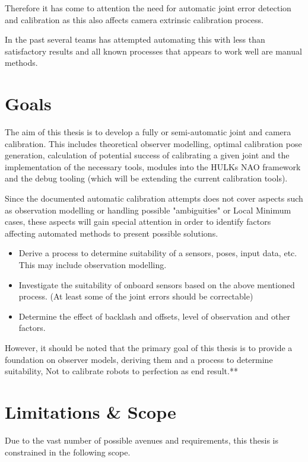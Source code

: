 \documentclass[english, printversion, nomenclature, notitle]{tuvisionthesis} %
\begin{document}
Therefore it has come to attention the need for automatic joint error detection and calibration as this also affects camera extrinsic calibration process.

In the past several teams has attempted automating this with less than satisfactory results and all known processes that appears to work well are manual methods. 

\section{Goals}
The aim of this thesis is to develop a fully or semi-automatic joint and camera calibration. This includes theoretical observer modelling, optimal calibration pose generation, calculation of potential success of calibrating a given joint and the implementation of the necessary tools, modules into the HULKs NAO framework and the debug tooling (which will be extending the current calibration tools).

Since the documented automatic calibration attempts does not cover aspects such as observation modelling or handling possible "ambiguities" or Local Minimum cases, these aspects will gain special attention in order to identify factors affecting automated methods to present possible solutions.

\begin{itemize}
	\item Derive a process to determine suitability of a sensors, poses, input data, etc. This may include observation modelling.
	\item Investigate the suitability of onboard sensors based on the above mentioned process. (At least some of the joint errors should be correctable)
	\item Determine the effect of backlash and offsets, level of observation and other factors.
\end{itemize}

However, it should be noted that the primary goal of this thesis is to provide a foundation on observer models, deriving them and a process to determine suitability, Not to calibrate robots to perfection as end result.**

\section{Limitations \& Scope}

Due to the vast number of possible avenues and requirements, this thesis is constrained in the following scope.
\end{document}
